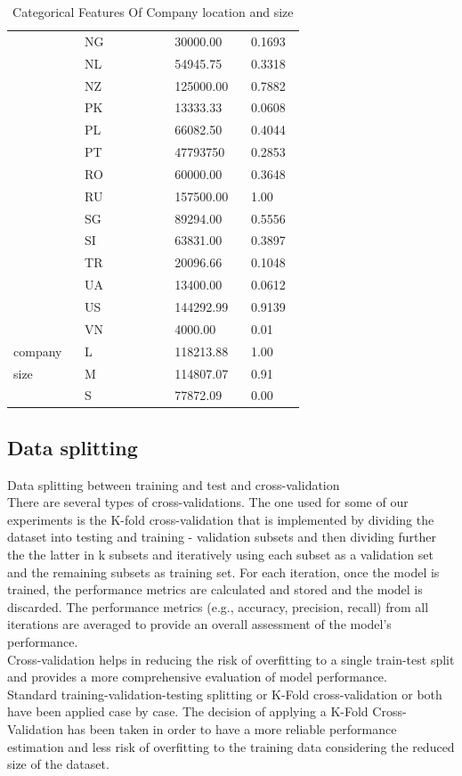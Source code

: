\documentclass[11pt,a4paper]{article}
\begin{document}
\begin{table}
\begin{tabular}{p{0.15\linewidth}|p{0.25\linewidth}|p{0.15\linewidth}|p{0.10\linewidth}}
&NG&30000.00&0.1693\\
&NL&54945.75&0.3318\\
&NZ&125000.00&0.7882\\
&PK&13333.33&0.0608\\
&PL&66082.50&0.4044\\
&PT&47793750&0.2853\\
&RO&60000.00&0.3648\\
&RU&157500.00&1.00\\
&SG&89294.00&0.5556\\
&SI&63831.00&0.3897\\
&TR&20096.66&0.1048\\
&UA&13400.00&0.0612\\
&US&144292.99&0.9139\\
&VN&4000.00&0.01\\
\hline
company&L&118213.88&1.00\\
size&M&114807.07&0.91\\
&S&77872.09&0.00\\
\hline\end{tabular}
\caption{Categorical Features Of Company location and size}
\label{tab:Categorical Features Of Company location and size}
\end{table}

\subsection{Data splitting} 
Data splitting between training and test and cross-validation
\\
There are several types of cross-validations. The one used for some of our experiments is the K-fold cross-validation that is implemented by dividing the dataset into testing and training - validation subsets and then dividing further the the latter in k subsets and iteratively using each subset as a validation set and the remaining subsets as training set. For each iteration, once the model is trained, the performance metrics are calculated and stored and the model is discarded. The performance metrics (e.g., accuracy, precision, recall) from all iterations are averaged to provide an overall assessment of the model's performance. \\
Cross-validation helps in reducing the risk of overfitting to a single train-test split and provides a more comprehensive evaluation of model performance. \\
Standard training-validation-testing splitting or K-Fold cross-validation or both have been applied case by case. The decision of applying a K-Fold Cross-Validation has been taken in order to have a more reliable performance estimation and less risk of overfitting to the training data considering the reduced size of the dataset.
\end{document}
